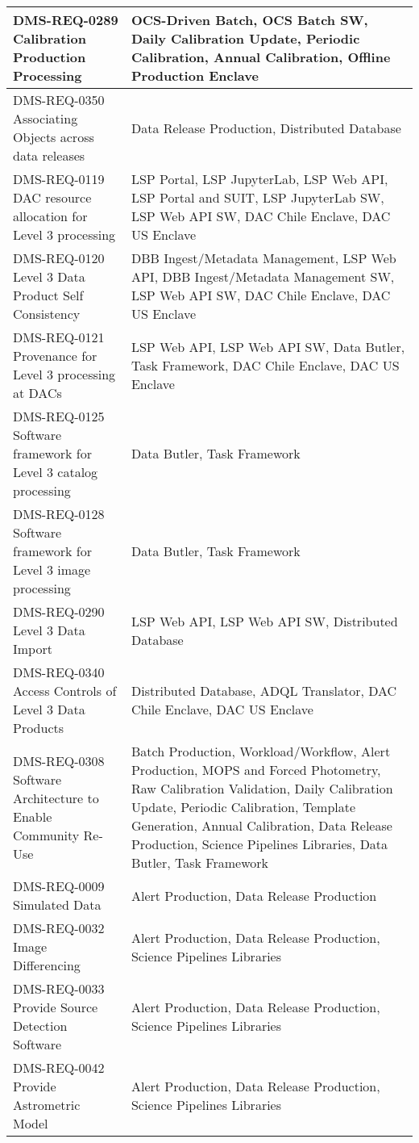 \begin{xtabular}{p{0.4\textwidth}p{0.55\textwidth}}
DMS-REQ-0289 Calibration Production Processing & OCS-Driven Batch, OCS Batch SW, Daily Calibration Update, Periodic Calibration, Annual Calibration, Offline Production Enclave \\ \hline
DMS-REQ-0350 Associating Objects across data releases & Data Release Production, Distributed Database \\ \hline
DMS-REQ-0119 DAC resource allocation for Level 3 processing & LSP Portal, LSP JupyterLab, LSP Web API, LSP Portal and SUIT, LSP JupyterLab SW, LSP Web API SW, DAC Chile Enclave, DAC US Enclave \\ \hline
DMS-REQ-0120 Level 3 Data Product Self Consistency & DBB Ingest/Metadata Management, LSP Web API, DBB Ingest/Metadata Management SW, LSP Web API SW, DAC Chile Enclave, DAC US Enclave \\ \hline
DMS-REQ-0121 Provenance for Level 3 processing at DACs & LSP Web API, LSP Web API SW, Data Butler, Task Framework, DAC Chile Enclave, DAC US Enclave \\ \hline
DMS-REQ-0125 Software framework for Level 3 catalog processing & Data Butler, Task Framework \\ \hline
DMS-REQ-0128 Software framework for Level 3 image processing & Data Butler, Task Framework \\ \hline
DMS-REQ-0290 Level 3 Data Import & LSP Web API, LSP Web API SW, Distributed Database \\ \hline
DMS-REQ-0340 Access Controls of Level 3 Data Products & Distributed Database, ADQL Translator, DAC Chile Enclave, DAC US Enclave \\ \hline
DMS-REQ-0308 Software Architecture to Enable Community Re-Use & Batch Production, Workload/Workflow, Alert Production, MOPS and Forced Photometry, Raw Calibration Validation, Daily Calibration Update, Periodic Calibration, Template Generation, Annual Calibration, Data Release Production, Science Pipelines Libraries, Data Butler, Task Framework \\ \hline
DMS-REQ-0009 Simulated Data & Alert Production, Data Release Production \\ \hline
DMS-REQ-0032 Image Differencing & Alert Production, Data Release Production, Science Pipelines Libraries \\ \hline
DMS-REQ-0033 Provide Source Detection Software & Alert Production, Data Release Production, Science Pipelines Libraries \\ \hline
DMS-REQ-0042 Provide Astrometric Model & Alert Production, Data Release Production, Science Pipelines Libraries \\ \hline

\end{xtabular}
